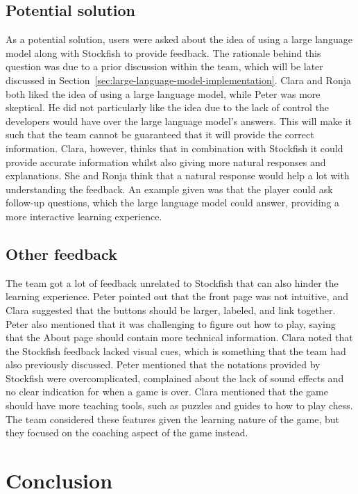 \subsection{Potential solution}\label{subsec:potential-solution}

As a potential solution, users were asked about the idea of using a large language model along with Stockfish to provide
feedback.
The rationale behind this question was due to a prior discussion within the team, which will be later discussed in
Section~\ref{sec:large-language-model-implementation}.
Clara and Ronja both liked the idea of using a large language model, while Peter was more skeptical.
He did not particularly like the idea due to the lack of control the developers would have over the large language
model's answers.
This will make it such that the team cannot be guaranteed that it will provide the correct information.
Clara, however, thinks that in combination with Stockfish it could provide accurate information whilst also giving more
natural responses and explanations.
She and Ronja think that a natural response would help a lot with understanding the feedback.
An example given was that the player could ask follow-up questions, which the large language model could answer,
providing a more interactive learning experience.

\subsection{Other feedback}\label{subsec:other-feedback}

The team got a lot of feedback unrelated to Stockfish that can also hinder the learning experience.
Peter pointed out that the front page was not intuitive, and Clara suggested that the buttons should be larger, labeled,
and link together.
Peter also mentioned that it was challenging to figure out how to play, saying that the About page should contain
more technical information.
Clara noted that the Stockfish feedback lacked visual cues, which is something that the team had also previously
discussed.
Peter mentioned that the notations provided by Stockfish were overcomplicated, complained about the lack of sound
effects and no clear indication for when a game is over.
Clara mentioned that the game should have more teaching tools, such as puzzles and guides to how to play chess.
The team considered these features given the learning nature of the game, but they focused on the coaching aspect of the
game instead.

\section{Conclusion}\label{sec:tests-conclusion}

